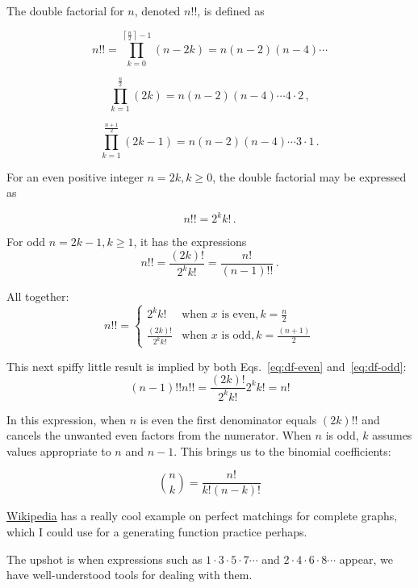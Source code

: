\documentclass{article}
\begin{document}
The double factorial for $n$, denoted $n!!$, is defined as

\begin{equation}
  n!! = \prod_{k=0}^{\left\lceil\frac{n}{2}\right\rceil - 1} (n-2k) = n (n-2) (n-4) \cdots
\end{equation}

\begin{equation}
  \prod_{k=1}^\frac{n}{2} (2k) = n(n-2)(n-4)\cdots 4\cdot 2\,,
\end{equation}

\begin{equation}
  \prod_{k=1}^\frac{n+1}{2} (2k-1) = n(n-2)(n-4)\cdots 3\cdot 1 \,.
\end{equation}

For an even positive integer $n = 2k, k \geq 0$, the double factorial may be expressed as

\begin{equation}\label{eq:df-even}
{\displaystyle n!!=2^{k}k!\,.}
\end{equation}

For odd $n = 2k - 1, k \geq 1$, it has the expressions
\begin{equation}\label{eq:df-odd}
{\displaystyle n!!={\frac {(2k)!}{2^{k}k!}}={\frac {n!}{(n-1)!!}}\,.}
\end{equation}

All together:
\begin{equation}
n!! = \begin{cases}
  2^kk! & \text{when } x \text{ is even}, k = \frac{n}{2} \\
  \frac{(2k)!}{2^kk!} & \text{when } x \text{ is odd}, k = \frac{(n+1)}{2}
\end{cases}
\end{equation}


This next spiffy little result is implied by both
Eqs.~\ref{eq:df-even} and~\ref{eq:df-odd}:
\begin{equation}
  (n-1)!!n!! = \frac{(2k)!}{2^kk!}2^kk! = n!
\end{equation}

In this expression, when $n$ is even the first denominator equals $(2k)!!$
and cancels the unwanted even factors from the numerator. When $n$ is odd,
$k$ assumes values appropriate to $n$ and $n-1$. This brings us to the binomial
coefficients:

\[
  \binom{n}{k} = \frac{n!}{k!(n-k)!}
\]

\href{https://en.wikipedia.org/wiki/Double\_factorial}{Wikipedia} has a
really cool example on perfect matchings for complete graphs, which I could use
for a generating function practice perhaps.

The upshot is when expressions such as $1\cdot3\cdot5\cdot7\cdots$ and
$2\cdot4\cdot6\cdot8\cdots$ appear, we have well-understood tools for dealing
with them.




{}

\end{document}
